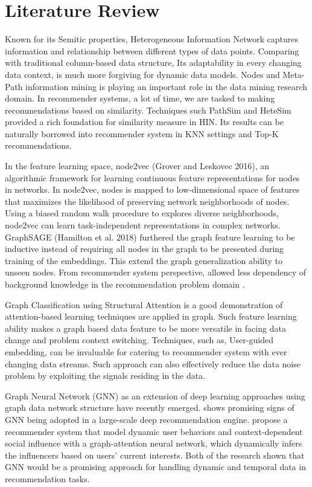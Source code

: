\section{Literature Review}

Known for its Semitic properties, Heterogeneous Information Network captures information and relationship between different types of data points. Comparing with traditional column-based data structure, Its adaptability in every changing data context, is much more forgiving for dynamic data models. Nodes and Meta-Path information mining is playing an important role in the data mining research domain. In recommender systems, a lot of time, we are tasked to making recommendations based on similarity. Techniques such PathSim \citep{Sun2011PathSim} and HeteSim \citep{Shi2013HeteSim} provided a rich foundation for similarity measure in HIN. Its results can be naturally borrowed into recommender system in KNN settings and Top-K recommendations. 

In the feature learning space, node2vec (Grover and Leskovec 2016), an algorithmic framework for learning continuous feature representations for nodes in networks. In node2vec, nodes is mapped to low-dimensional space of features that maximizes the likelihood of preserving network neighborhoods of nodes. Using a biased random walk procedure to explores diverse neighborhoods, node2vec can learn task-independent representations in complex networks. GraphSAGE (Hamilton et al. 2018) furthered the graph feature learning to be inductive instead of requiring all nodes in the graph to be presented during training of the embeddings. This extend the graph generalization ability to unseen nodes. From recommender system perspective, allowed less dependency of background knowledge in the recommendation problem domain \citep{Hu2018}.  

Graph Classification using Structural Attention \citep{lee2018graph} is a good demonstration of attention-based learning techniques are applied in graph. Such feature learning ability makes a graph based data feature to be more versatile in facing data change and problem context switching. 
Techniques, such as, User-guided embedding, can be invaluable for catering to recommender system with ever changing data streams. Such approach can also effectively reduce the data noise problem by exploiting the signals residing in the data.  

Graph Neural Network (GNN) as an extension of deep learning approaches using graph data network structure have recently emerged. \citet{ying2018graph} shows promising signs of GNN being adopted in a large-scale deep recommendation engine. \citet{song2019session} propose a recommender system that model dynamic user behaviors and context-dependent social influence with a graph-attention neural network, which dynamically infers the influencers based on users’ current interests. Both of the research shown that GNN would be a promising approach for handling dynamic and temporal data in recommendation tasks.